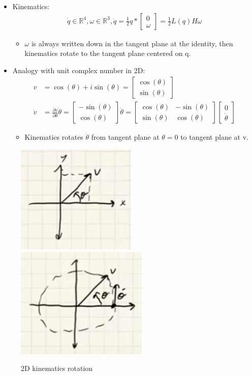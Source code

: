 \begin{itemize}
    \item Kinematics:
    \begin{align}
        \dot q \in \mathbb{R}^4, \omega \in \mathbb{R}^3, \dot q = \frac{1}{2} q *
        \begin{bmatrix}
            0 \\ \omega
        \end{bmatrix} = \frac{1}{2} L(q) H \omega
    \end{align}
    \begin{itemize}
        \item $\omega$ is always written down in the tangent plane at the identity, then kinematics rotate to the tangent plane centered on q.
    \end{itemize}
    \item Analogy with unit complex number in 2D:
    \begin{align}
        v & = \cos(\theta) + i \sin(\theta) = 
        \begin{bmatrix}
            \cos(\theta) \\ \sin(\theta)
        \end{bmatrix} \\
        \dot v & = \frac{\partial v }{\partial \theta} \dot \theta = 
        \begin{bmatrix}
            - \sin(\theta) \\ \cos(\theta) 
        \end{bmatrix} \dot \theta =
        \begin{bmatrix}
            \cos(\theta) & -\sin(\theta) \\
            \sin(\theta) & \cos(\theta)
        \end{bmatrix}
        \begin{bmatrix}
            0 \\ \dot \theta
        \end{bmatrix}
    \end{align}
    \begin{itemize}
        \item Kinematics rotates $\dot \theta$ from tangent plane at $\theta = 0$ to tangent plane at v.
    \end{itemize} 
\end{itemize}

\begin{figure}
    \centering
    \includegraphics[width=0.2\linewidth]{L11_Images/F5.PNG}
    \includegraphics[width=0.2\linewidth]{L11_Images/F6.PNG}
    \caption{2D kinematics rotation}
    \label{fig:l11f5}
\end{figure}

